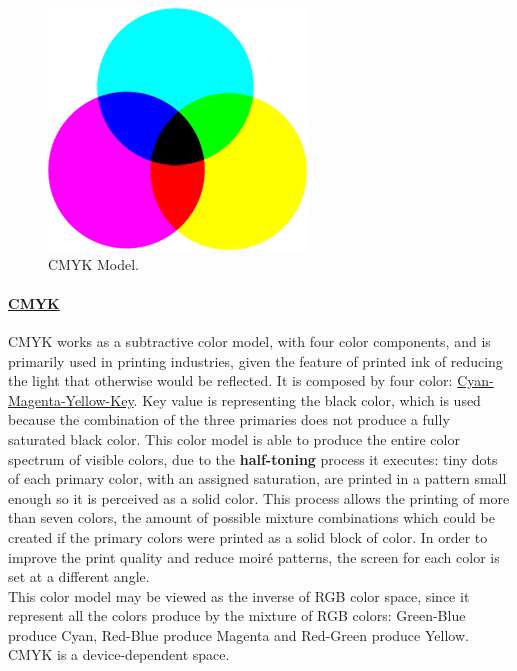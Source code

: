 \begin{figure}
	\centering
	\vspace{-10pt}
	\includegraphics[width=\linewidth]{images/background/CMYK.jpg}
	\caption[CMYK Color Model Representation]{CMYK Model.\protect\footnotemark{}}
	\label{fig:CMYK}
\end{figure}
%
\paragraph{\ul{CMYK}} CMYK works as a subtractive color model, with four color
components, and is primarily used in printing industries, given the feature of printed ink of reducing
the light that otherwise would be reflected. It is composed by four color: \ul{Cyan-Magenta-Yellow-Key}.
Key value is representing the black color, which is used because the combination of the three primaries
does not produce a fully saturated black color. This color model is able to produce the entire color
spectrum of visible colors, due to the \textbf{half-toning} process it executes: tiny dots of each
primary color, with an assigned saturation, are printed in a pattern small enough so it is perceived
as a solid color. This process allows the printing of more than seven colors, the
amount of possible mixture combinations which could be created if the primary colors were printed as
a solid block of color. In order to improve the print quality and reduce moiré patterns, the screen
for each color is set at a different angle. \\
This color model may be viewed as the inverse of RGB color space, since it represent all the colors
produce by the mixture of RGB colors: Green-Blue produce Cyan, Red-Blue produce Magenta and Red-Green
produce Yellow. CMYK is a device-dependent space. \par
{}
%
